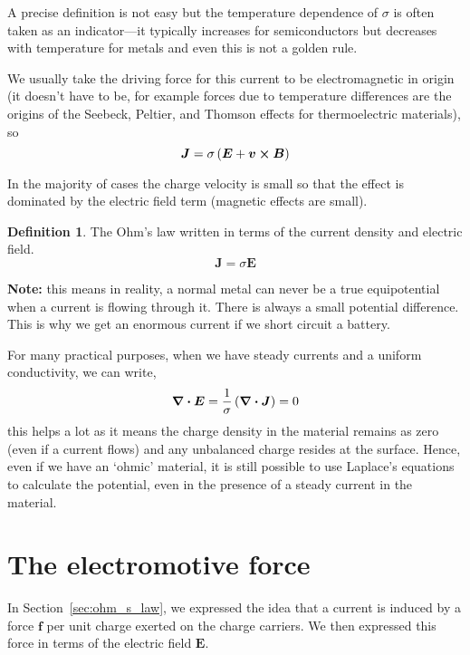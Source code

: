 \documentclass[12pt,chapterprefix=false,dvipsnames]{scrbook}
\theoremstyle{dotless}
\theoremstyle{definition}
\newtheorem{protodefinition}{Definition}[section]
\newenvironment{definition}
{\colorlet{shadecolor}{black!15}\begin{shaded}\begin{protodefinition}}
			{\end{protodefinition}\end{shaded}}
\begin{document}
A precise definition is not easy but the temperature dependence
of $\sigma$ is often taken as an indicator---it
typically increases for semiconductors but decreases with
temperature for metals and even this is not a golden rule.

We usually take the driving force for this current to be
electromagnetic in origin (it doesn't have to be, for example
forces due to temperature differences are the origins of the
Seebeck, Peltier, and Thomson effects for thermoelectric
materials), so
\begin{equation}
	\bm{J} = \sigma\left(\bm{E} + \bm{v}\cross\bm{B}\right)
\end{equation}

In the majority of cases the charge velocity is small so that
the effect is dominated by the electric field term (magnetic
effects are small).

\begin{definition}
	The Ohm's law written in terms of the current density and
	electric field.
	\begin{equation}
		\bm{J} = \sigma\bm{E}
	\end{equation}
\end{definition}

\textbf{Note:} this means in reality, a normal metal
can never be a true equipotential when a current is flowing
through it. There is always a small potential difference. This
is why we get an enormous current if we short circuit a battery.

For many practical purposes, when we have steady currents and a
uniform conductivity, we can write,
\begin{equation}
	\divergence{\bm{E}}
	=
	\frac{1}{\sigma}\left(\divergence{\bm{J}}\right) = 0
\end{equation}
this helps a lot as it means the charge density in the material
remains as zero (even if a current flows) and any unbalanced
charge resides at the surface. Hence, even if we have an `ohmic'
material, it is still possible to use Laplace's equations to
calculate the potential, even in the presence of a steady
current in the material.

\section{The electromotive force}%
\label{sec:the_electromotive_force}

In Section~\ref{sec:ohm_s_law}, we expressed the idea that
a current is induced by a force $\bm{f}$ per unit
charge exerted on the charge carriers. We then expressed this
force in terms of the electric field $\bm{E}$.
\end{document}
